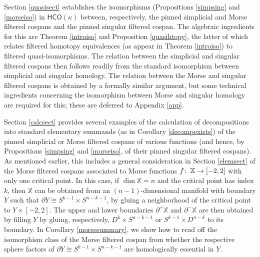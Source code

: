\documentclass[11pt]{amsart}
\theoremstyle{definition}
\theoremstyle{remark}
\numberwithin{equation}{section}
\def\co{\colon\thinspace}
\begin{document}
Section \ref{quasisect} establishes the isomorphisms (Propositions \ref{simpsing} and \ref{morseiso}) in $\mathsf{HCO}(\kappa)$ between, respectively, the pinned simplicial and Morse filtered cospans and the pinned singular filtered cospan.  The algebraic ingredients for this are Theorem \ref{introiso} and Proposition \ref{quasihtopy}, the latter of which relates filtered homotopy equivalences (as appear in Theorem \ref{introiso}) to filtered quasi-isomorphisms.  The relation between the simplicial and singular filtered cospans then follows readily from the standard isomorphism between simplicial and singular homology.  The relation between the Morse and singular filtered cospans is obtained by a formally similar argument, but some technical ingredients concerning the isomorphism between Morse and singular homology are required for this; these are deferred to Appendix \ref{app}.

Section \ref{calcsect} provides several examples of the calculation of decompositions into standard elementary summands (as in Corollary \ref{decompexists}) of the pinned simplicial or Morse filtered cospans of various functions (and hence, by Propositions \ref{simpsing} and \ref{morseiso}, of their pinned singular filtered cospans). As mentioned earlier, this includes a general consideration in Section \ref{elemsect} of the Morse filtered cospans associated to Morse functions $f\co\mathbb{X}\to [-2,2]$ with only one critical point.  In this case, if $\dim \mathbb{X}=n$ and the critical point has index $k$, then $\mathbb{X}$ can be obtained from an $(n-1)$-dimensional manifold with boundary $Y$ such that $\partial Y\cong S^{k-1}\times S^{n-k-1}$, by gluing a neighborhood of the critical point to $Y\times [-2,2]$.  The upper and lower boundaries $\partial^+\mathbb{X}$ and $\partial^-\mathbb{X}$ are then obtained by filling  $Y$ by gluing, respectively, $D^k\times S^{n-k-1}$ or $S^{k-1}\times D^{n-k}$ to its boundary.  In Corollary \ref{morsesummary}, we show how to read off the isomorphism class of the Morse filtered cospan from whether the respective sphere factors of $\partial Y\cong S^{k-1}\times S^{n-k-1}$ are homologically essential in $Y$.
\end{document}
